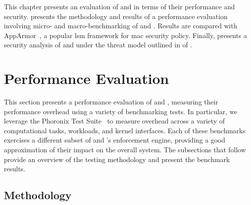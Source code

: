 This chapter presents an evaluation of \bpfbox{} and \bpfcontain{} in terms of their
performance and security.  presents the methodology and results
of a performance evaluation involving micro- and macro-benchmarking of \bpfbox{} and
\bpfcontain{}. Results are compared with AppArmor~\cite{cowan2000_apparmor}, a popular
\gls{lsm} framework for \gls{mac} security policy. Finally, 
presents a security analysis of \bpfbox{} and \bpfcontain{} under the threat model
outlined in  of .

\section{Performance Evaluation}%
\label{s:eval-performance}

This section presents a performance evaluation of \bpfbox{} and \bpfcontain{}, measuring
their performance overhead using a variety of benchmarking tests. In particular, we
leverage the Phoronix Test Suite~\cite{phoronix} to measure overhead across a variety of
computational tasks, workloads, and kernel interfaces. Each of these benchmarks exercises
a different subset of \bpfbox{} and \bpfcontain{}'s enforcement engine, providing a good
approximation of their impact on the overall system. The subsections that follow provide an
overview of the testing methodology and present the benchmark results.

\subsection{Methodology}%
\label{ss:eval-methodology}

